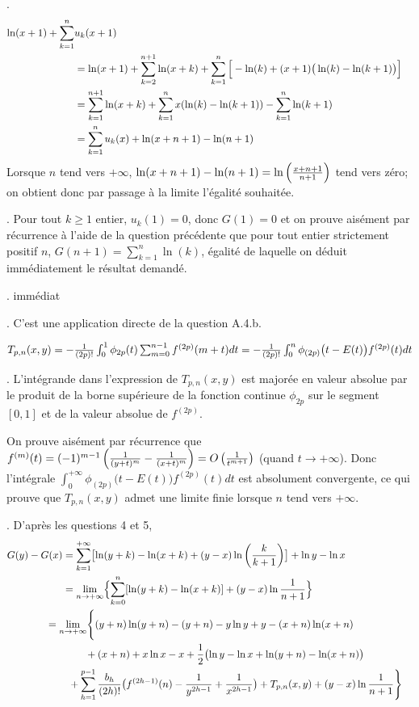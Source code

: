 {\begin{enumerate}
{. 
$$\begin{aligned}
\ln(x+1)+\sum_{k=1}^n &u_k(x+1)  \cr
        &=\ln(x+1) + \sum_{k=2}^{n+1} \ln(x+k)
                        + \sum_{k=1}^n \Big[ -\ln(k)
                                + (x+1) \big(\ln(k)-\ln(k+1)\big) \Big] \cr
        &=\sum_{k=1}^{n+1} \ln(x+k)                                
                        + \sum_{k=1}^n  x (\ln(k)-\ln(k+1)) 
                        - \sum_{k=1}^n \ln(k+1)        \cr
        &=\sum_{k=1}^n u_k(x) + \ln(x+n+1) - \ln(n+1)  \cr
\end{aligned}
$$
Lorsque $n$ tend vers $+\infty$,
$\ln(x+n+1) - \ln(n+1)=\ln \left( {x+n+1 \over n+1} \right)$ tend vers zéro;
on obtient donc par passage à la limite l'égalité souhaitée.

. Pour tout $k\geq1$ entier, $u_k(1)=0$, donc $G(1)=0$ et
on prouve aisément par récurrence à l'aide de la question précédente
que pour tout entier strictement positif $n$, $G(n+1)=\sum_{k=1}^n \ln(k)$,
égalité de laquelle on déduit immédiatement le résultat demandé.

. immédiat

. C'est une application directe de la question A.4.b.\par
$T_{p,n}(x,y)=-{1\over(2p)!}\int_0^1 \phi_{2p}(t)
                        \sum_{m=0}^{n-1} f^{(2p)}(m+t) dt
=-{1\over(2p)!} \int_0^n \phi_{(2p)} \big( t-E(t) \big) f^{(2p)}(t)dt$


. L'intégrande dans l'expression de $T_{p,n}(x,y)$ est majorée en valeur
absolue par le produit de la borne supérieure de la fonction continue
$\phi_{2p}$ sur le segment $[0,1]$ et de la valeur absolue de $f^{(2p)}$.

On prouve aisément par récurrence que
$f^{(m)}(t)=(-1)^{m-1}\left({1\over(y+t)^m}-{1\over(x+t)^m}\right)
= O \left( {1\over t^{m+1}} \right)$ (quand $t \to +\infty$).
Donc l'intégrale $\int_0^{+\infty} \phi_{(2p)} \big( t-E(t) \big) f^{(2p)}(t)dt$
est absolument convergente, ce qui prouve que $T_{p,n}(x,y)$ admet une limite
finie lorsque $n$ tend vers $+\infty$.



. D'après les questions 4 et 5,
$$\begin{aligned}
G(y)-G(x)&=\sum_{k=1}^{+\infty}\bigl[ \ln(y+k) - \ln(x+k)
                        + (y-x)\ln\left({k\over k+1}\right) \bigr] + \ln y - \ln x \cr
        &=\lim_{n\to +\infty}\Bigl\{\sum_{k=0}^n [\ln(y+k) - \ln(x+k)]
                 + (y-x)\ln{1\over n+1} \Bigr\}                          \cr 
        &\mkern-30mu =\lim_{n\to +\infty} \Biggl\{
                 (y+n)\ln(y+n) - (y+n) - y\ln y + y - (x+n)\ln(x+n)             \cr
        &\mkern40mu  + (x+n) + x\ln x - x
         + {1\over2} \bigl( \ln y - \ln x + \ln(y+n) - \ln(x+n) \bigr)          \cr
        &\mkern10mu +\sum_{h=1}^{p-1} {b_h\over(2h)!}
                \big( f^{(2h-1)}(n) - {1\over y^{2h-1}} + {1\over x^{2h-1}}\big) 
         + T_{p,n}(x,y) + (y-x)\ln{1\over n+1} \Biggr\}                  \cr
\end{aligned}
$$

}
\end{enumerate}}
